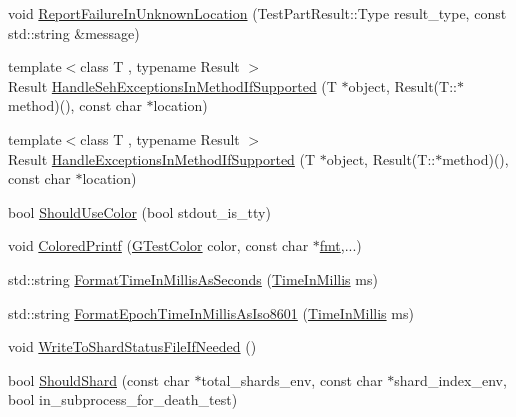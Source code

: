 \begin{DoxyCompactItemize}
\item 
void \mbox{\hyperlink{namespacetesting_1_1internal_a85f6ff0e40f9a5f10af66a73cf1364fa}{Report\+Failure\+In\+Unknown\+Location}} (Test\+Part\+Result\+::\+Type result\+\_\+type, const std\+::string \&message)
\item 
{\footnotesize template$<$class T , typename Result $>$ }\\Result \mbox{\hyperlink{namespacetesting_1_1internal_ac5293b438139ef7ed05cb7fcaaf63545}{Handle\+Seh\+Exceptions\+In\+Method\+If\+Supported}} (T $\ast$object, Result(T\+::$\ast$method)(), const char $\ast$location)
\item 
{\footnotesize template$<$class T , typename Result $>$ }\\Result \mbox{\hyperlink{namespacetesting_1_1internal_addb2ed165b92b74e25fe9ebe9e46b9f9}{Handle\+Exceptions\+In\+Method\+If\+Supported}} (T $\ast$object, Result(T\+::$\ast$method)(), const char $\ast$location)
\item 
bool \mbox{\hyperlink{namespacetesting_1_1internal_ac1db1b4603967a6c4404f31cbbac31a6}{Should\+Use\+Color}} (bool stdout\+\_\+is\+\_\+tty)
\item 
void \mbox{\hyperlink{namespacetesting_1_1internal_a1d9493ff218e622051c53094eb54bcd6}{Colored\+Printf}} (\mbox{\hyperlink{namespacetesting_1_1internal_a648c1bc94c2ef9e868ff3f9dff0f9c4e}{G\+Test\+Color}} color, const char $\ast$\mbox{\hyperlink{namespacetesting_1_1internal_a503360987bcbc4722e1f2e10a14254d8}{fmt}},...)
\item 
std\+::string \mbox{\hyperlink{namespacetesting_1_1internal_a904485f27a54be8a5a92856e2d838797}{Format\+Time\+In\+Millis\+As\+Seconds}} (\mbox{\hyperlink{namespacetesting_1_1internal_a5eed833eddf9ea8ca45546c125f4ef0c}{Time\+In\+Millis}} ms)
\item 
std\+::string \mbox{\hyperlink{namespacetesting_1_1internal_a5ef227c4a610e7ff638b12dfb25b068e}{Format\+Epoch\+Time\+In\+Millis\+As\+Iso8601}} (\mbox{\hyperlink{namespacetesting_1_1internal_a5eed833eddf9ea8ca45546c125f4ef0c}{Time\+In\+Millis}} ms)
\item 
void \mbox{\hyperlink{namespacetesting_1_1internal_a19b35b39782d41e6ef76e1910a3a502e}{Write\+To\+Shard\+Status\+File\+If\+Needed}} ()
\item 
bool \mbox{\hyperlink{namespacetesting_1_1internal_a8688e48645d951b8e42b61d2e4b2890e}{Should\+Shard}} (const char $\ast$total\+\_\+shards\+\_\+env, const char $\ast$shard\+\_\+index\+\_\+env, bool in\+\_\+subprocess\+\_\+for\+\_\+death\+\_\+test)
\item 

\end{DoxyCompactItemize}
